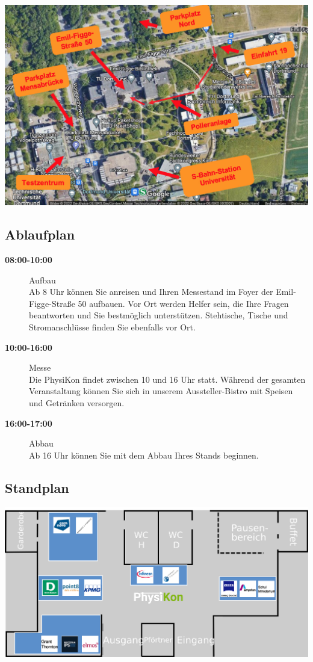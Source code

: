 \documentclass[
  paper=a4,
  fontsize=12pt,
  DIV=16,
  headheight=30pt,
  footheight=45pt,
  headinclude,
  parskip=half,
]{scrartcl}
\begin{document}
\includegraphics[width=\textwidth]{images/anfahrtskizze.jpg}


\subsection*{Ablaufplan}
\begin{description}
    \item[\textbf{08:00-10:00}] Aufbau\\
      Ab 8 Uhr können Sie anreisen und Ihren Messestand im Foyer der Emil-Figge-Straße 50 aufbauen.
      Vor Ort werden Helfer sein, die Ihre Fragen beantworten und Sie bestmöglich unterstützen.
      Stehtische, Tische und Stromanschlüsse finden Sie ebenfalls vor Ort.
    \item[\textbf{10:00-16:00}] Messe\\
      Die PhysiKon findet zwischen 10 und 16 Uhr statt.
      Während der gesamten Veranstaltung können Sie sich in unserem Aussteller-Bistro mit Speisen und Getränken versorgen.
    \item[\textbf{16:00-17:00}] Abbau\\
      Ab 16 Uhr können Sie mit dem Abbau Ihres Stands beginnen.
  \end{description}

\subsection*{Standplan}

\includegraphics[width=\textwidth]{images/messeplan24.png}
\end{document}
